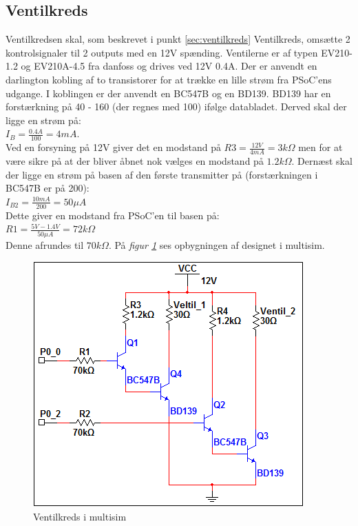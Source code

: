 \subsection{Ventilkreds}
Ventilkredsen skal, som beskrevet i punkt \ref{sec:ventilkreds} Ventilkreds, omsætte 2 kontrolsignaler til 2 outputs med en 12V spænding. Ventilerne er af typen EV210-1.2 og EV210A-4.5 fra danfoss og drives ved 12V 0.4A. Der er anvendt en darlington kobling af to transistorer for at trække en lille strøm fra PSoC'ens udgange. I koblingen er der anvendt en BC547B og en BD139. BD139 har en forstærkning på 40 - 160 (der regnes med 100) ifølge databladet. Derved skal der ligge en strøm på:\\
$I_{B}=\frac{0.4A}{100}=4mA$. \\
Ved en forsyning på 12V giver det en modstand på $R3=\frac{12V}{4mA}=3k\Omega$ men for at være sikre på at der bliver åbnet nok vælges en modstand på $1.2k\Omega$.
Dernæst skal der ligge en strøm på basen af den første transmitter på (forstærkningen i BC547B er på 200):\\
$I_{B2}=\frac{10m A}{200}=50\mu A$\\
Dette giver en modstand fra PSoC'en til basen på:\\
$R1=\frac{5V-1.4V}{50\mu A}=72k\Omega$\\
Denne afrundes til $70k\Omega$. På \textit{figur \ref{fig:ventilkreds}} ses opbygningen af designet i multisim.
\begin{figure}[H]
\centering
\includegraphics[scale=.75]{billeder/ventilkreds}
\caption{Ventilkreds i multisim}
\label{fig:ventilkreds}
\end{figure}

